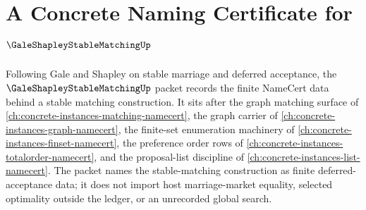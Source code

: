 \chapter{A Concrete Naming Certificate for $\GaleShapleyStableMatchingUp$}
\label{ch:concrete-instances-gale-shapley-stable-matching-namecert}

Following Gale and Shapley on stable marriage and deferred acceptance, the $\GaleShapleyStableMatchingUp$ packet records the finite NameCert data behind a stable matching construction. It sits after the graph matching surface of \autoref{ch:concrete-instances-matching-namecert}, the graph carrier of \autoref{ch:concrete-instances-graph-namecert}, the finite-set enumeration machinery of \autoref{ch:concrete-instances-finset-namecert}, the preference order rows of \autoref{ch:concrete-instances-totalorder-namecert}, and the proposal-list discipline of \autoref{ch:concrete-instances-list-namecert}. The packet names the stable-matching construction as finite deferred-acceptance data; it does not import host marriage-market equality, selected optimality outside the ledger, or an unrecorded global search.

